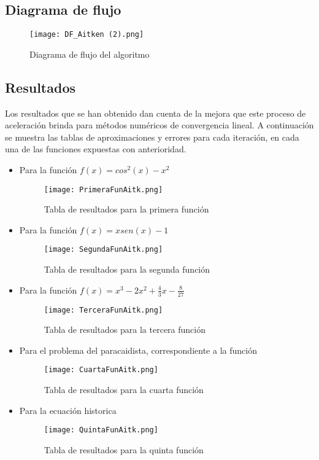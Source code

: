 \documentclass{article}
\begin{document}
\subsection{Diagrama de flujo}
\begin{figure}[H]
    \centering
    \texttt{[image: DF\_Aitken (2).png]}
    \caption{Diagrama de flujo del algoritmo}
    \label{fig:DiagramaFlujoAitken}
\end{figure}
\subsection{Resultados}
Los resultados que se han obtenido dan cuenta de la mejora que este proceso de aceleración brinda para métodos numéricos de convergencia lineal. A continuación se muestra las tablas de aproximaciones y errores para cada iteración, en cada una de las funciones expuestas con anterioridad.
\begin{itemize}
	\item Para la función \(f(x) = cos^2(x)-x^2\)
        \begin{figure}[H]
        \centering
        \texttt{[image: PrimeraFunAitk.png]}
        \caption{Tabla de resultados para la primera función}
        \label{fig:TablaFun1Aitk}
        \end{figure}
    \item Para la función \(f(x) = xsen(x)-1\)
        \begin{figure}[H]
        \centering
        \texttt{[image: SegundaFunAitk.png]}
        \caption{Tabla de resultados para la segunda función}
        \label{fig:TablaFun2Aitk}
        \end{figure}
    \item Para la función \(f(x) = x^3-2x^2+\frac{4}{3}x-\frac{8}{27}\)
        \begin{figure}[H]
        \centering
        \texttt{[image: TerceraFunAitk.png]}
        \caption{Tabla de resultados para la tercera función}
        \label{fig:TablaFun3Aitk}
        \end{figure}
    \item Para el problema del paracaidista, correspondiente a la función 
        \begin{figure}[H]
        \centering
        \texttt{[image: CuartaFunAitk.png]}
        \caption{Tabla de resultados para la cuarta función}
        \label{fig:TablaFun5Aitk}
        \end{figure}
    \item Para la ecuación historica  
        \begin{figure}[H]
        \centering
        \texttt{[image: QuintaFunAitk.png]}
        \caption{Tabla de resultados para la quinta función}
        \label{fig:TablaFun4Aitk}
        \end{figure}
\end{itemize}        
\end{document}
